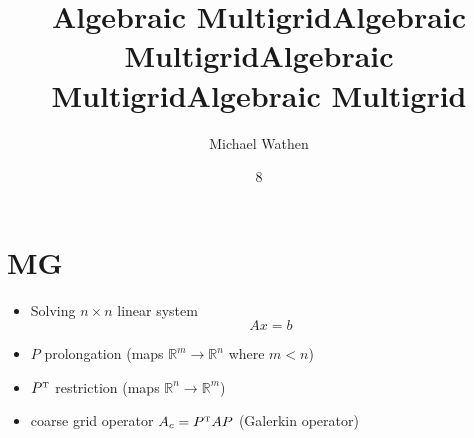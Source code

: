 \documentclass{beamer}
\title{Algebraic Multigrid}
\author{Michael Wathen}
\institute{UBC Computer Science}
\date{8}
\begin{document}
\begin{frame}

\title{Algebraic Multigrid}
\titlepage
\title{Algebraic Multigrid}

\end{frame}

\title{Algebraic Multigrid}





\section{MG}
\begin{frame}

\begin{itemize}
  \item  Solving  $n\times n$ linear system$$Ax=b$$
  \item $P$ prolongation (maps $\mathbb{R}^m \rightarrow \mathbb{R}^n$ where $m<n$)
  \item $P^{\mbox{\tiny T}}$ restriction (maps $\mathbb{R}^n \rightarrow \mathbb{R}^m$)
  \item coarse grid operator $A_c = P^{\mbox{\tiny T}}AP$ (Galerkin operator)
\end{itemize}

\end{frame}
\end{document}
